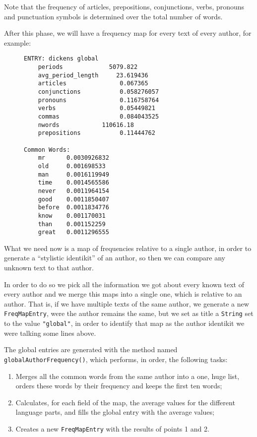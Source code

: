\documentclass[a4paper,11pt, twoside]{article}
\begin{document}
		\noindent
		Note that the frequency of articles, prepositions, conjunctions, verbs, pronouns and punctuation symbols is determined over the total number of words.
		
		\noindent
		After this phase, we will have a frequency map for every text of every author, for example:

	\begin{figure}[h!]
		\centering
		\begin{BVerbatim}[fontsize=\small]
ENTRY: dickens global
	periods             5079.822
	avg_period_length     23.619436
	articles               0.067365
	conjunctions           0.058276057
	pronouns               0.116758764
	verbs                  0.05449821
	commas                 0.084043525
	nwords            110616.18
	prepositions           0.11444762

Common Words:
	mr      0.0030926832
	old     0.001698533
	man     0.0016119949
	time    0.0014565586
	never   0.0011964154
	good    0.0011850407
	before  0.0011834776
	know    0.001170031
	than    0.001152259
	great   0.0011296555
	\end{BVerbatim}
\end{figure}

		\noindent
		What we need now is a map of frequencies relative to a single author, in order to generate a ``stylistic identikit''  of an author, so then we can compare any unknown text to that author.

		\noindent
		In order to do so we pick all the information we got about every known text of every author and we merge this maps into a single one, which is relative to an author. That is, if we have multiple texts of the same author, we generate a new \lstinline|FreqMapEntry|, were the author remains the same, but we set as title a \lstinline|String| set to the value \lstinline|"global"|, in order to identify that map as the author identikit we were talking some lines above.

		\bigskip
		\noindent
		The global entries are generated with the method named \lstinline|globalAuthorFrequency()|, which performs, in order, the following tasks: \begin{enumerate}
		\item Merges all the common words from the same author into a one, huge list, orders these words by their frequency and keeps the first ten words;
		\item Calculates, for each field of the map, the average values for the different language parts, and fills the global entry with the average values;
		\item Creates a new \lstinline|FreqMapEntry| with the results of points 1 and 2.
		\end{enumerate}
\end{document}
